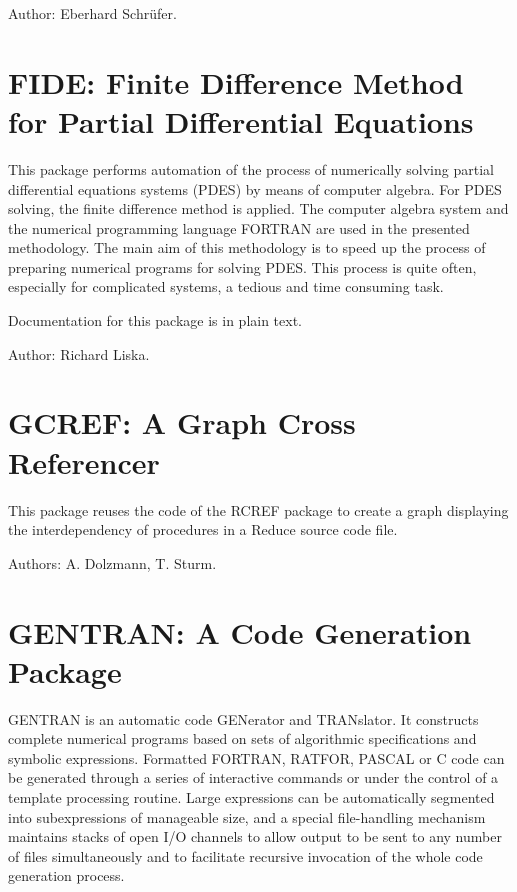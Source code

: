 Author: Eberhard Schr\"ufer.



\newpage

\section{FIDE: Finite Difference Method for Partial Differential Equations}

This package performs  automation of  the process of numerically
solving  partial  differential  equations  systems  (PDES)  by  means of
computer algebra.  For PDES solving, the finite difference method is applied.
The  computer  algebra  system  \REDUCE  and  the  numerical  programming
language FORTRAN  are used in the presented methodology. The main aim of
this methodology is to speed up the process of preparing numerical
programs for  solving PDES.  This process is quite often, especially for
complicated systems, a tedious and time consuming task.

Documentation for this package is in plain text.

Author: Richard Liska.



\newpage


\section{GCREF: A Graph Cross Referencer}
\label{GCREF}

This package reuses the code of the RCREF package to create a graph displaying
the interdependency of procedures in a Reduce source code file.

Authors: A. Dolzmann, T. Sturm.



\newpage

\section{GENTRAN: A Code Generation Package}
\label{GENTRAN}


GENTRAN is an automatic code GENerator and TRANslator. It constructs
complete numerical programs based on sets of algorithmic specifications
and symbolic expressions. Formatted FORTRAN, RATFOR, PASCAL or C code can be
generated through a series of interactive commands or under the control of
a template processing routine. Large expressions can be automatically
segmented into subexpressions of manageable size, and a special
file-handling mechanism maintains stacks of open I/O channels to allow
output to be sent to any number of files simultaneously and to facilitate
recursive invocation of the whole code generation process.

